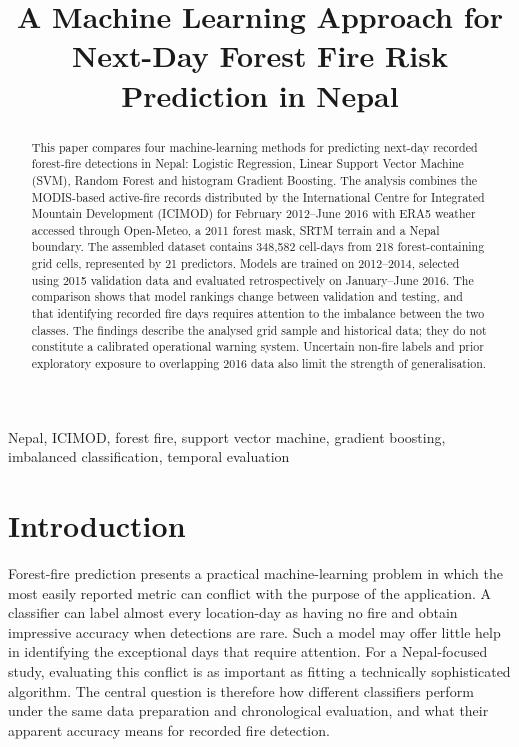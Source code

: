\documentclass[conference,a4paper]{IEEEtran}
\title{A Machine Learning Approach for Next-Day Forest Fire Risk Prediction in Nepal}
\author{\IEEEauthorblockN{Krijal Shrestha}\IEEEauthorblockA{Coventry ID: 11495103\\STW7072CEM Machine Learning\\Softwarica College of IT and E-commerce, Coventry University}}
\begin{document}
\maketitle
\begin{abstract}
This paper compares four machine-learning methods for predicting next-day recorded forest-fire detections in Nepal: Logistic Regression, Linear Support Vector Machine (SVM), Random Forest and histogram Gradient Boosting. The analysis combines the MODIS-based active-fire records distributed by the International Centre for Integrated Mountain Development (ICIMOD) for February 2012--June 2016 with ERA5 weather accessed through Open-Meteo, a 2011 forest mask, SRTM terrain and a Nepal boundary. The assembled dataset contains 348,582 cell-days from 218 forest-containing grid cells, represented by 21 predictors. Models are trained on 2012--2014, selected using 2015 validation data and evaluated retrospectively on January--June 2016. The comparison shows that model rankings change between validation and testing, and that identifying recorded fire days requires attention to the imbalance between the two classes. The findings describe the analysed grid sample and historical data; they do not constitute a calibrated operational warning system. Uncertain non-fire labels and prior exploratory exposure to overlapping 2016 data also limit the strength of generalisation.
\end{abstract}
\begin{IEEEkeywords}
Nepal, ICIMOD, forest fire, support vector machine, gradient boosting, imbalanced classification, temporal evaluation
\end{IEEEkeywords}

\section{Introduction}
Forest-fire prediction presents a practical machine-learning problem in which the most easily reported metric can conflict with the purpose of the application. A classifier can label almost every location-day as having no fire and obtain impressive accuracy when detections are rare. Such a model may offer little help in identifying the exceptional days that require attention. For a Nepal-focused study, evaluating this conflict is as important as fitting a technically sophisticated algorithm. The central question is therefore how different classifiers perform under the same data preparation and chronological evaluation, and what their apparent accuracy means for recorded fire detection.
\end{document}
